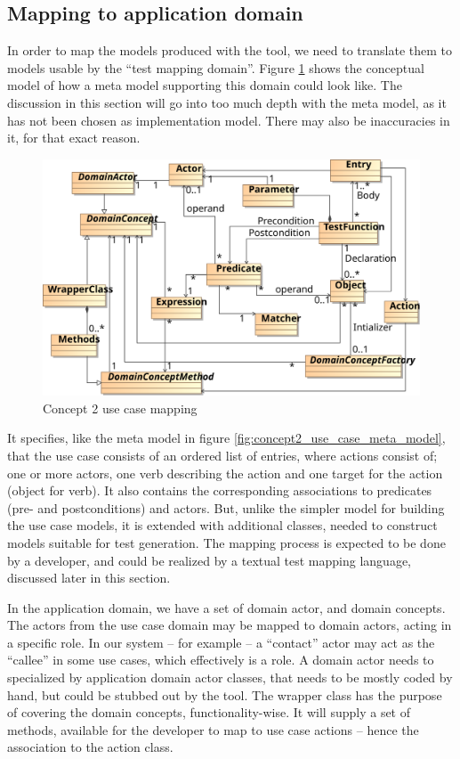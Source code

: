 \subsection{Mapping to application domain}
In order to map the models produced with the tool, we need to translate them to models usable by the ``test mapping domain''. Figure \ref{fig:concept2_use_case_mapping} shows the conceptual model of how a meta model supporting this domain could look like. The discussion in this section will go into too much depth with the meta model, as it has not been chosen as implementation model. There may also be inaccuracies in it, for that exact reason.
\begin{figure}[!htbp]
  \centering
  \includegraphics[scale=0.72]{img/concept2_use_case_mapping}
  \caption{Concept 2 use case mapping}
  \label{fig:concept2_use_case_mapping}
\end{figure}It specifies, like the meta model in figure \ref{fig:concept2_use_case_meta_model}, that the use case consists of an ordered list of entries, where actions consist of; one or more actors, one verb describing the action and one target for the action (object for verb). It also contains the corresponding associations to predicates (pre- and postconditions) and actors. But, unlike the simpler model for building the use case models, it is extended with additional classes, needed to construct models suitable for test generation. The mapping process is expected to be done by a developer, and could be realized by a textual test mapping language, discussed later in this section.\medskip

\noindent In the application domain, we have a set of domain actor, and domain concepts. The actors from the use case domain may be mapped to domain actors, acting in a specific role. In our system -- for example -- a ``contact'' actor may act as the ``callee'' in some use cases, which effectively is a role. A domain actor needs to specialized by application domain actor classes, that needs to be mostly coded by hand, but could be stubbed out by the tool. The wrapper class has the purpose of covering the domain concepts, functionality-wise. It will supply a set of methods, available for the developer to map to use case actions -- hence the association to the action class.\medskip

